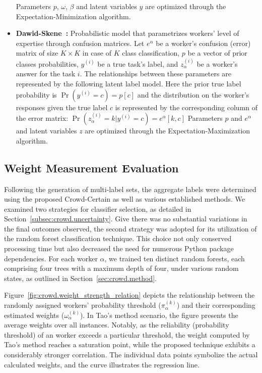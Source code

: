 \begin{itemize}
    Parameters $p$, $\omega$, $\beta$ and latent variables $y$ are optimized through the Expectation-Minimization algorithm.

    \item \textbf{Dawid-Skene~\cite{dawid_Maximum_1979,crowdkit_webpage_documentation}:}
    Probabilistic model that parametrizes workers' level of expertise through confusion matrices.  Let $e^{\alpha}$ be a worker's confusion (error) matrix of size $K \times K$ in case of $K$ class classification, $p$ be a vector of prior classes probabilities, $y^{(i)}$ be a true task's label, and $z_{\alpha}^{(i)}$ be a worker's answer for the task $i$. The relationships between these parameters are represented by the following latent label model.
    Here the prior true label probability is $\Pr(y^{(i)} = c) = p[c]$ and the distribution on the worker's responses given the true label $c$ is represented by the
    corresponding column of the error matrix: $\Pr(z_{\alpha}^{(i)} = k \vert y^{(i)} = c) = e^{\alpha}[k, c]$
    Parameters $p$ and $e^{\alpha}$ and latent variables $z$ are optimized through the Expectation-Maximization algorithm.
\end{itemize}

\subsection{Weight Measurement Evaluation}
Following the generation of multi-label sets, the aggregate labels were determined using the proposed Crowd-Certain as well as various established methods. We examined two strategies for classifier selection, as detailed in Section~\ref{subsec:crowd.uncertainty}. Give there was no substantial variations in the final outcomes observed, the second strategy was adopted for its utilization of the random forest classification technique. This choice not only conserved processing time but also decreased the need for numerous Python package dependencies. For each worker $\alpha $, we trained ten distinct random forests, each comprising four trees with a maximum depth of four, under various random states, as outlined in Section~\ref{sec:crowd.method}.

Figure~\ref{fig:crowd.weight_strength_relation} depicts the relationship between the randomly assigned workers' probability threshold ($\pi_\alpha^{(k)}$) and their corresponding estimated weights ($\omega_\alpha^{(k)}$). In Tao's method scenario, the figure presents the average weights over all instances. Notably, as the reliability (probability threshold) of an worker exceeds a particular threshold, the weight computed by Tao's method reaches a saturation point, while the proposed technique exhibits a considerably stronger correlation. The individual data points symbolize the actual calculated weights, and the curve illustrates the regression line.

